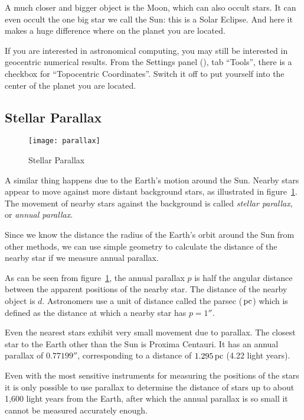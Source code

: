 A much closer and bigger object is the Moon, which can also occult
stars. It can even occult the one big star we call the Sun: this is a
Solar Eclipse. And here it makes a huge difference where on the planet
you are located. 

If you are interested in astronomical computing, you may still be
interested in geocentric numerical results. From the Settings panel
(), tab ``Tools'', there is a checkbox for ``Topocentric
Coordinates''. Switch it off to put yourself into the center of the
planet you are located.

\subsection{Stellar Parallax}
\label{sec:Concepts:StellarParallax}

\begin{figure}[tb]
\centering\texttt{[image: parallax]}
\caption{Stellar Parallax}
\label{fig:Parallax}
\end{figure}

A similar thing happens due to the Earth's motion around the Sun. Nearby
stars appear to move against more distant background stars, as
illustrated in figure~\ref{fig:Parallax}.
The movement of nearby stars against the background is called
\emph{stellar parallax}, or \emph{annual parallax}.

Since we know the distance the radius of the Earth's orbit around the
Sun from other methods, we can use simple geometry to calculate the
distance of the nearby star if we measure annual parallax.

As can be seen from figure~\ref{fig:Parallax}, the annual
parallax $p$ is half the angular distance between the apparent positions
of the nearby star. The distance of the nearby object is $d$. Astronomers
use a unit of distance called the parsec ($\pc$) which is defined as the
distance at which a nearby star has $p=1''$.

Even the nearest stars exhibit very small movement due to
parallax. The closest star to the Earth other than the Sun is Proxima
Centauri. It has an annual parallax of $0.77199''$, corresponding to a
distance of $1.295\pc$ (4.22 light years).

Even with the most sensitive instruments for measuring the positions of
the stars it is only possible to use parallax to determine the distance
of stars up to about 1,600 light years from the Earth, after which the
annual parallax is so small it cannot be measured accurately enough.

